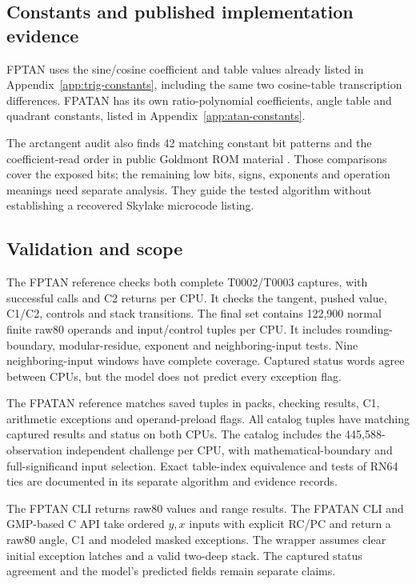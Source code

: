 \documentclass[11pt]{article}
\begin{document}
\subsection{Constants and published implementation evidence}

FPTAN uses the sine/cosine coefficient and table values already listed in
Appendix~\ref{app:trig-constants}, including the same two cosine-table transcription differences. FPATAN has its own ratio-polynomial coefficients, angle table and
quadrant constants, listed in Appendix~\ref{app:atan-constants}.

The arctangent audit also finds 42 matching constant bit patterns and the
coefficient-read order in public Goldmont ROM material
\cite{ucodeDisasm,customProcessingUnit}. Those comparisons cover the exposed
bits; the remaining low bits, signs, exponents and operation meanings need
separate analysis. They guide the tested algorithm without establishing a
recovered Skylake microcode listing.

\subsection{Validation and scope}
\label{sec:tangent-validation}



The FPTAN reference checks both complete T0002/T0003 captures, with
\TanSuccess{} successful calls and \TanRange{} C2 returns per CPU. It checks
the tangent, pushed value, C1/C2, controls and stack transitions. The final
set contains 122,900 normal finite raw80 operands and \TanRows{} input/control
tuples per CPU. It includes rounding-boundary, modular-residue, exponent and
neighboring-input tests. Nine neighboring-input windows have complete coverage. Captured status words agree between CPUs, but the model
does not predict every exception flag.

The FPATAN reference matches \AtanRows{} saved tuples in \AtanPacks{} packs,
checking results, C1, arithmetic exceptions and operand-preload flags.
All catalog tuples have matching captured results and status on both CPUs. The catalog includes the 445,588-observation independent challenge per
CPU, with mathematical-boundary and full-significand input selection.
Exact table-index equivalence and tests of RN64 ties are documented in its
separate algorithm and evidence records.

The FPTAN CLI returns raw80 values and range results. The FPATAN CLI and
GMP-based C API take ordered $y,x$ inputs with explicit RC/PC and return a
raw80 angle, C1 and modeled masked exceptions. The wrapper assumes clear
initial exception latches and a valid two-deep stack. The captured status
agreement and the model's predicted fields remain separate claims.
\end{document}
